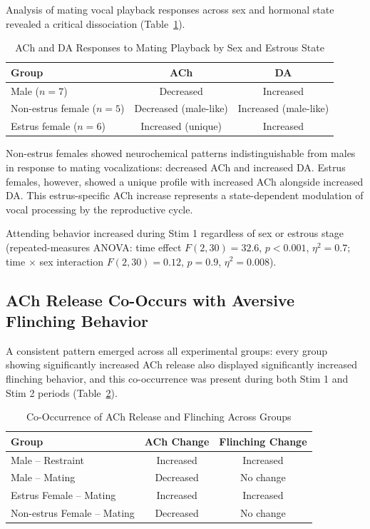 \documentclass[11pt]{article}
\begin{document}
Analysis of mating vocal playback responses across sex and hormonal state revealed a critical dissociation (Table~\ref{tab:sex}).

\begin{table}[ht]
\centering
\caption{ACh and DA Responses to Mating Playback by Sex and Estrous State}
\label{tab:sex}
\begin{tabular}{lcc}
\toprule
\textbf{Group} & \textbf{ACh} & \textbf{DA} \\
\midrule
Male ($n = 7$) & Decreased & Increased \\
Non-estrus female ($n = 5$) & Decreased (male-like) & Increased (male-like) \\
Estrus female ($n = 6$) & Increased (unique) & Increased \\
\bottomrule
\end{tabular}
\end{table}

Non-estrus females showed neurochemical patterns indistinguishable from males in response to mating vocalizations: decreased ACh and increased DA. Estrus females, however, showed a unique profile with increased ACh alongside increased DA. This estrus-specific ACh increase represents a state-dependent modulation of vocal processing by the reproductive cycle.

Attending behavior increased during Stim 1 regardless of sex or estrous stage (repeated-measures ANOVA: time effect $F(2,30) = 32.6$, $p < 0.001$, $\eta^2 = 0.7$; time $\times$ sex interaction $F(2,30) = 0.12$, $p = 0.9$, $\eta^2 = 0.008$).

\subsection{ACh Release Co-Occurs with Aversive Flinching Behavior}

A consistent pattern emerged across all experimental groups: every group showing significantly increased ACh release also displayed significantly increased flinching behavior, and this co-occurrence was present during both Stim 1 and Stim 2 periods (Table~\ref{tab:flinch}).

\begin{table}[ht]
\centering
\caption{Co-Occurrence of ACh Release and Flinching Across Groups}
\label{tab:flinch}
\begin{tabular}{lcc}
\toprule
\textbf{Group} & \textbf{ACh Change} & \textbf{Flinching Change} \\
\midrule
Male -- Restraint & Increased & Increased \\
Male -- Mating & Decreased & No change \\
Estrus Female -- Mating & Increased & Increased \\
Non-estrus Female -- Mating & Decreased & No change \\
\bottomrule
\end{tabular}
\end{table}
\end{document}
